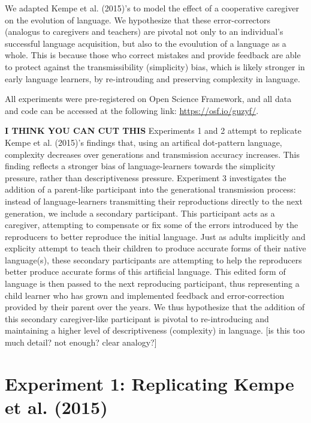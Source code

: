 \documentclass[10pt, letterpaper]{article}
\begin{document}
We adapted Kempe et al. (2015)'s to model the effect of a cooperative
caregiver on the evolution of language. We hypothesize that these
error-correctors (analogus to caregivers and teachers) are pivotal not
only to an individual's successful language acquisition, but also to the
evoulution of a language as a whole. This is because those who correct
mistakes and provide feedback are able to protect against the
transmissibility (simplicity) bias, which is likely stronger in early
language learners, by re-introuding and preserving complexity in
language.

All experiments were pre-registered on Open Science Framework, and all
data and code can be accessed at the following link:
\url{https://osf.io/guzyf/}.

\textbf{I THINK YOU CAN CUT THIS} Experiments 1 and 2 attempt to
replicate Kempe et al. (2015)'s findings that, using an artifical
dot-pattern language, complexity decreases over generations and
transmission accuracy increases. This finding reflects a stronger bias
of language-learners towards the simplicity pressure, rather than
descriptiveness pressure. Experiment 3 investigates the addition of a
parent-like participant into the generational transmission process:
instead of language-learners transmitting their reproductions directly
to the next generation, we include a secondary participant. This
participant acts as a caregiver, attempting to compensate or fix some of
the errors introduced by the reproducers to better reproduce the initial
language. Just as adults implicitly and explicity attempt to teach their
children to produce accurate forms of their native language(s), these
secondary participants are attempting to help the reproducers better
produce accurate forms of this artificial language. This edited form of
language is then passed to the next reproducing participant, thus
representing a child learner who has grown and implemented feedback and
error-correction provided by their parent over the years. We thus
hypothesize that the addition of this secondary caregiver-like
participant is pivotal to re-introducing and maintaining a higher level
of descriptiveness (complexity) in language. {[}is this too much detail?
not enough? clear analogy?{]}

\hypertarget{experiment-1-replicating-kempe-2015}{%
\section{Experiment 1: Replicating Kempe et al.
(2015)}\label{experiment-1-replicating-kempe-2015}}
\end{document}
